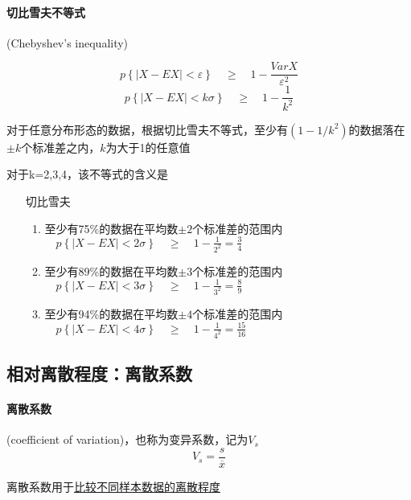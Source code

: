 \documentclass[UTF8,10pt]{book}
\begin{document}
                \paragraph{切比雪夫不等式} (Chebyshev's inequality)
                
                $$ p\left\lbrace |X-EX|<\varepsilon \right\rbrace  \quad \geq \quad 1 - \frac{VarX}{\varepsilon^2} $$
                $$ p\left\lbrace |X-EX|<k\sigma\right\rbrace  \quad \geq \quad 1 - \frac{1}{k^2} $$
                
                对于任意分布形态的数据，根据切比雪夫不等式，至少有$(1-1/k^2)$的数据落在$\pm k$个标准差之内，$k$为大于1的任意值
                
                {\kaishu 对于k=2,3,4，该不等式的含义是}
                \begin{itemize}
                	\item [切比雪夫] {
                		\begin{enumerate}
                			\item 至少有75\%的数据在平均数$\pm 2$个标准差的范围内  $\quad  p\left\lbrace |X-EX|<2\sigma\right\rbrace  \quad \geq \quad 1 - \frac{1}{2^2} = \frac{3}{4} $
                			\item 至少有89\%的数据在平均数$\pm 3$个标准差的范围内  $\quad  p\left\lbrace |X-EX|<3\sigma\right\rbrace  \quad \geq \quad 1 - \frac{1}{3^2} = \frac{8}{9} $
                			\item 至少有94\%的数据在平均数$\pm 4$个标准差的范围内  $\quad  p\left\lbrace |X-EX|<4\sigma\right\rbrace  \quad \geq \quad 1 - \frac{1}{4^2} = \frac{15}{16} $
                			
                		\end{enumerate}
                	}
                \end{itemize}


        \subsection{相对离散程度：离散系数}
                \paragraph{离散系数} (coefficient of variation)，也称为变异系数，记为$V_s$
                $$ V_s = \frac{s}{\overline{x}} $$

                {\kaishu 离散系数用于\underline{比较不同样本数据的离散程度}}
\end{document}
